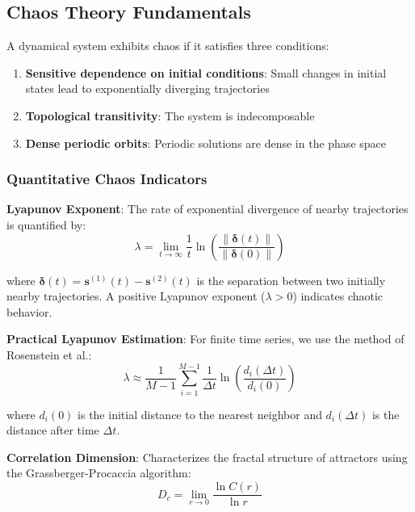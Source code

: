 \documentclass[11pt,a4paper]{article}
\begin{document}
\subsection{Chaos Theory Fundamentals}

A dynamical system exhibits chaos if it satisfies three conditions:
\begin{enumerate}
    \item \textbf{Sensitive dependence on initial conditions}: Small changes in initial states lead to exponentially diverging trajectories
    \item \textbf{Topological transitivity}: The system is indecomposable
    \item \textbf{Dense periodic orbits}: Periodic solutions are dense in the phase space
\end{enumerate}

\subsubsection{Quantitative Chaos Indicators}

\textbf{Lyapunov Exponent}: The rate of exponential divergence of nearby trajectories is quantified by:
\begin{equation}
\lambda = \lim_{t \to \infty} \frac{1}{t} \ln\left(\frac{\|\boldsymbol{\delta}(t)\|}{\|\boldsymbol{\delta}(0)\|}\right)
\end{equation}

where $\boldsymbol{\delta}(t) = \mathbf{s}^{(1)}(t) - \mathbf{s}^{(2)}(t)$ is the separation between two initially nearby trajectories. A positive Lyapunov exponent ($\lambda > 0$) indicates chaotic behavior.

\textbf{Practical Lyapunov Estimation}: For finite time series, we use the method of Rosenstein et al.:
\begin{equation}
\lambda \approx \frac{1}{M-1} \sum_{i=1}^{M-1} \frac{1}{\Delta t} \ln\left(\frac{d_i(\Delta t)}{d_i(0)}\right)
\end{equation}

where $d_i(0)$ is the initial distance to the nearest neighbor and $d_i(\Delta t)$ is the distance after time $\Delta t$.

\textbf{Correlation Dimension}: Characterizes the fractal structure of attractors using the Grassberger-Procaccia algorithm:
\begin{equation}
D_c = \lim_{r \to 0} \frac{\ln C(r)}{\ln r}
\end{equation}
\end{document}
